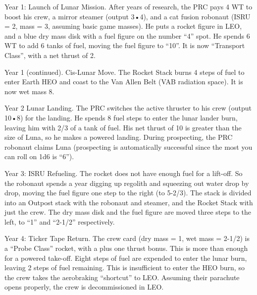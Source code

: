 \documentclass[a4paper]{book}
\begin{document}
Year 1: Launch of Lunar Mission. After years of research, the PRC pays 4 WT to boost his crew, a mirror steamer (output 3•4), and a cat fusion robonaut (ISRU = 2, mass = 3, assuming basic game masses). He puts a rocket figure in LEO, and a blue dry mass disk with a fuel figure on the number “4” spot. He spends 6 WT to add 6 tanks of fuel, moving the fuel figure to “10”. It is now “Transport Class”, with a net thrust of 2.

Year 1 (continued). Cis-Lunar Move. The Rocket Stack burns 4 steps of fuel to enter Earth HEO and coast to the Van Allen Belt (VAB radiation space). It is now wet mass 8.

Year 2 Lunar Landing. The PRC switches the active thruster to his crew (output 10•8) for the landing. He spends 8 fuel steps to enter the lunar lander burn, leaving him with 2/3 of a tank of fuel. His net thrust of 10 is greater than the size of Luna, so he makes a powered landing. During prospecting, the PRC robonaut claims Luna (prospecting is automatically successful since the most you can roll on 1d6 is “6”).

Year 3: ISRU Refueling. The rocket does not have enough fuel for a lift-off. So the robonaut spends a year digging up regolith and squeezing out water drop by drop, moving the fuel figure one step to the right (to 5-2/3). The stack is divided into an Outpost stack with the robonaut and steamer, and the Rocket Stack with just the crew. The dry mass disk and the fuel figure are moved three steps to the left, to “1” and “2-1/2” respectively.

Year 4: Ticker Tape Return. The crew card (dry mass = 1, wet mass = 2-1/2) is a “Probe Class” rocket, with a plus one thrust bonus. This is more than enough for a powered take-off. Eight steps of fuel are expended to enter the lunar burn, leaving 2 steps of fuel remaining. This is insufficient to enter the HEO burn, so the crew takes the aerobraking “shortcut” to LEO. Assuming their parachute opens properly, the crew is decommissioned in LEO.
\end{document}
